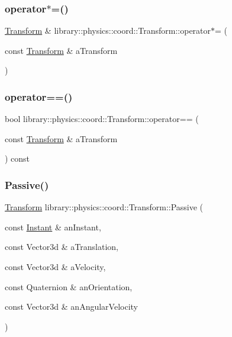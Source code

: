 \subsubsection{\texorpdfstring{operator$\ast$=()}{operator*=()}}
{\footnotesize\ttfamily \hyperlink{classlibrary_1_1physics_1_1coord_1_1_transform}{Transform} \& library\+::physics\+::coord\+::\+Transform\+::operator$\ast$= (\begin{DoxyParamCaption}\item[{const \hyperlink{classlibrary_1_1physics_1_1coord_1_1_transform}{Transform} \&}]{a\+Transform }\end{DoxyParamCaption})}

\mbox{\label{classlibrary_1_1physics_1_1coord_1_1_transform_a7fd14bfb2953041a020521c3b34c5309}} 
\subsubsection{\texorpdfstring{operator==()}{operator==()}}
{\footnotesize\ttfamily bool library\+::physics\+::coord\+::\+Transform\+::operator== (\begin{DoxyParamCaption}\item[{const \hyperlink{classlibrary_1_1physics_1_1coord_1_1_transform}{Transform} \&}]{a\+Transform }\end{DoxyParamCaption}) const}

\mbox{\label{classlibrary_1_1physics_1_1coord_1_1_transform_ac8d745aa497d7713a19aa8652acb02c6}} 
\subsubsection{\texorpdfstring{Passive()}{Passive()}}
{\footnotesize\ttfamily \hyperlink{classlibrary_1_1physics_1_1coord_1_1_transform}{Transform} library\+::physics\+::coord\+::\+Transform\+::\+Passive (\begin{DoxyParamCaption}\item[{const \hyperlink{classlibrary_1_1physics_1_1time_1_1_instant}{Instant} \&}]{an\+Instant,  }\item[{const Vector3d \&}]{a\+Translation,  }\item[{const Vector3d \&}]{a\+Velocity,  }\item[{const Quaternion \&}]{an\+Orientation,  }\item[{const Vector3d \&}]{an\+Angular\+Velocity }\end{DoxyParamCaption})\hspace{0.3cm}{\ttfamily [static]}}

